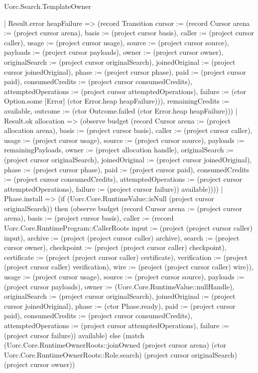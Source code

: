 \begin{lexlean}{Uorc.Search.TemplateOwner}
\begin{semanticmodule}
{        | Result.error heapFailure => (record Transition {cursor := (record Cursor {arena := (project cursor arena), basis := (project cursor basis), caller := (project cursor caller), usage := (project cursor usage), source := (project cursor source), payloads := (project cursor payloads), owner := (project cursor owner), originalSearch := (project cursor originalSearch), joinedOriginal := (project cursor joinedOriginal), phase := (project cursor phase), paid := (project cursor paid), consumedCredits := (project cursor consumedCredits), attemptedOperations := (project cursor attemptedOperations), failure := (ctor Option.some [Error] (ctor Error.heap heapFailure))}), remainingCredits := available, outcome := (ctor Outcome.failed (ctor Error.heap heapFailure))})
        | Result.ok allocation => (observe budget (record Cursor {arena := (project allocation arena), basis := (project cursor basis), caller := (project cursor caller), usage := (project cursor usage), source := (project cursor source), payloads := remainingPayloads, owner := (project allocation handle), originalSearch := (project cursor originalSearch), joinedOriginal := (project cursor joinedOriginal), phase := (project cursor phase), paid := (project cursor paid), consumedCredits := (project cursor consumedCredits), attemptedOperations := (project cursor attemptedOperations), failure := (project cursor failure)}) available))))
    | Phase.install => (if (Uorc.Core.RuntimeValue::isNull (project cursor originalSearch)) then (observe budget (record Cursor {arena := (project cursor arena), basis := (project cursor basis), caller := (record Uorc.Core.RuntimeProgram::CallerRoots {input := (project (project cursor caller) input), archive := (project (project cursor caller) archive), search := (project cursor owner), checkpoint := (project (project cursor caller) checkpoint), certificate := (project (project cursor caller) certificate), verification := (project (project cursor caller) verification), wire := (project (project cursor caller) wire)}), usage := (project cursor usage), source := (project cursor source), payloads := (project cursor payloads), owner := (Uorc.Core.RuntimeValue::nullHandle), originalSearch := (project cursor originalSearch), joinedOriginal := (project cursor joinedOriginal), phase := (ctor Phase.ready), paid := (project cursor paid), consumedCredits := (project cursor consumedCredits), attemptedOperations := (project cursor attemptedOperations), failure := (project cursor failure)}) available) else (match (Uorc.Core.RuntimeOwnerRoots::joinOwned (project cursor arena) (ctor Uorc.Core.RuntimeOwnerRoots::Role.search) (project cursor originalSearch) (project cursor owner))
}
\end{semanticmodule}
\end{lexlean}
